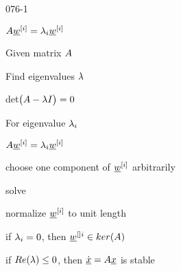 \begin{mitframe}{076-1}
\begin{listone}
	\item $\helmholtz\vort^{[\state]}=\wavel_{\state}\vort^{[\state]}$
    \item Given matrix $\helmholtz$
    	\begin{listtwo}
        	\item Find eigenvalues $\wavel$
            	\begin{listthree}
                	\item det$\big(\helmholtz-\wavel\mominertia\big)=0$
                \end{listthree}
        	\item For eigenvalue $\wavel_{\state}$
          	\begin{listthree}
            	\item $\helmholtz\vort^{[\state]}=\wavel_{\state}\vort^{[\state]}$
                	\begin{listfour}
                    	\item choose one component of $\vort^{[\state]}$ arbitrarily
                        \item solve
                        \item normalize $\vort^{[\state]}$ to unit length
                    \end{listfour}
			\end{listthree}
	\end{listtwo}
	\item if $\wavel_{\state}=0$, then $\vort^{[]\state}\in{ker}(\helmholtz)$
    \item if $\reynolds(\wavel)\leq{0}$, then $\dot{\uline{\disp}}=\helmholtz\uline{\disp}$ is stable
\end{listone}
\end{mitframe}